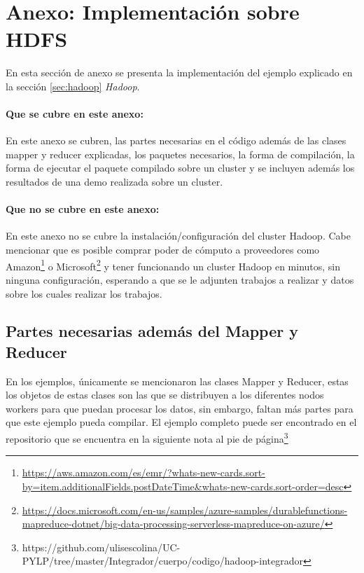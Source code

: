 \clearpage
\section*{Anexo: Implementación sobre HDFS}

En esta sección de anexo se presenta la implementación del ejemplo
explicado en la sección \ref{sec:hadoop} {\it Hadoop}. 

\paragraph{Que se cubre en este anexo:}
En este anexo se cubren,
las partes necesarias en el código además de las clases mapper y reducer
explicadas, los paquetes necesarios, la forma de compilación, la forma de
ejecutar el paquete compilado sobre un cluster y se incluyen además los
resultados de una demo realizada sobre un \gls{cluster}.

\paragraph{Que no se cubre en este anexo:}
En este anexo no se cubre la
instalación/configuración del \gls{cluster} Hadoop. Cabe mencionar que es
posible comprar poder de cómputo a proveedores como Amazon\footnote{\url{https://aws.amazon.com/es/emr/?whats-new-cards.sort-by=item.additionalFields.postDateTime&whats-new-cards.sort-order=desc}} o
Microsoft\footnote{\url{https://docs.microsoft.com/en-us/samples/azure-samples/durablefunctions-mapreduce-dotnet/big-data-processing-serverless-mapreduce-on-azure/}}
y tener funcionando un cluster Hadoop en minutos, sin ninguna configuración,
esperando a que se le adjunten trabajos a realizar y datos sobre los cuales
realizar los trabajos.

\subsection*{Partes necesarias además del Mapper y Reducer}
En los ejemplos, únicamente se mencionaron las clases Mapper y Reducer, estas
los objetos de estas clases son las que se distribuyen a los diferentes nodos
workers para que puedan procesar los datos, sin embargo, faltan más partes para
que este ejemplo pueda compilar. El ejemplo completo puede ser encontrado en
el repositorio que se encuentra en la siguiente nota al pie de
página\footnote{https://github.com/ulisescolina/UC-PYLP/tree/master/Integrador/cuerpo/codigo/hadoop-integrador}



